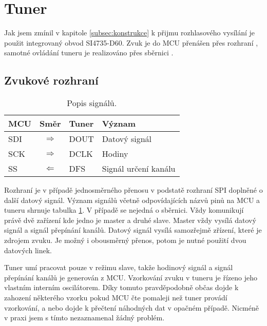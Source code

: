 \section{Tuner}
\label{sec:tuner}
Jak jsem zmínil v kapitole \ref{subsec:konstrukce} k přijmu rozhlasového vysílání je použit integrovaný obvod SI4735-D60. Zvuk je do MCU přenášen přes rozhraní \iis, samotné ovládání tuneru je realizováno přes sběrnici \iic.

\subsection{Zvukové rozhraní \iis}

\begin{table}[ht!]
\begin{center}
\begin{tabular}{|l|c|l|l|}
\hline 
MCU & Směr & Tuner & Význam \\ 
\hline 
SDI & $\Rightarrow$ & DOUT & Datový signál \\ 
\hline 
SCK & $\Rightarrow$ & DCLK & Hodiny \\ 
\hline
SS & $\Leftarrow$ & DFS & Signál určení kanálu \\ 
\hline 
\end{tabular}
\end{center}
\caption{Popis \iis signálů.}
\label{tab:iis_signals} 
\end{table}


Rozhraní \iis je v případě jednosměrného přenosu v podstatě rozhraní SPI doplněné o další datový signál. Význam signálů včetně odpovídajících názvů pinů na MCU a tuneru shrnuje tabulka \ref{tab:iis_signals}. V případě \iis se nejedná o sběrnici. Vždy komunikují právě dvě zařízení kde jedno je master a druhé slave. Master vždy vysílá datový signál a signál přepínání kanálů. Datový signál vysílá samozřejmě zřízení, které je zdrojem zvuku. Je možný i obousměrný přenos, potom je nutné použití dvou datových linek.

Tuner umí pracovat pouze v režimu slave, takže hodinový signál a signál přepínání kanálů je generován z MCU. Vzorkování zvuku v tuneru je řízeno jeho vlastním interním oscilátorem. Díky tomuto pravděpodobně občas dojde k zahození některého vzorku pokud MCU čte pomaleji než tuner provádí vzorkování, a nebo dojde k přečtení náhodných dat v opačném případě. Nicméně v praxi jsem s tímto nezaznamenal žádný problém.  


